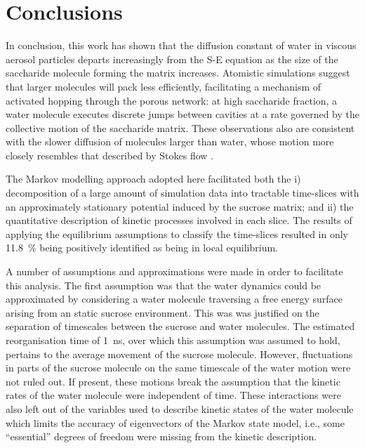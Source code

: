 \section{Conclusions}\label{sec:wat_conclusions}
In conclusion, this work has shown that the diffusion constant of water in viscous aerosol particles departs increasingly from the S-E equation as the size of the saccharide molecule forming the matrix increases. Atomistic simulations suggest that larger molecules will pack less efficiently, facilitating a mechanism of activated hopping through the porous network: at high saccharide fraction, a water molecule executes discrete jumps between cavities at a rate governed by the collective motion of the saccharide matrix. These observations also are consistent with the slower diffusion of molecules larger than water, whose motion more closely resembles that described by Stokes flow \cite{Gonzalez2015}.

The Markov modelling approach adopted here facilitated both the i) decomposition of a large amount of simulation data into tractable time-slices with an approximately stationary potential induced by the sucrose matrix; and ii) the quantitative description of kinetic processes involved in each slice. The results of applying the equilibrium assumptions to classify the time-slices resulted in only \SI{11.8}{\percent} being positively identified as being in local equilibrium.

A number of assumptions and approximations were made in order to facilitate this analysis. The first assumption was that the water dynamics could be approximated by considering a water molecule traversing a free energy surface arising from an static sucrose environment. This was was justified on the separation of timescales between the sucrose and water molecules. The estimated reorganisation time of \SI{1}{\nano\second}, over which this assumption was assumed to hold, pertains to the average movement of the sucrose molecule. However, fluctuations in parts of the sucrose molecule on the same timescale of the water motion were not ruled out. If present, these motions break the assumption that the kinetic rates of the water molecule were independent of time. These interactions were also left out of the variables used to describe kinetic states of the water molecule which limits the accuracy of eigenvectors of the Markov state model, i.e., some ``essential'' degrees of freedom were missing from the kinetic description. 

